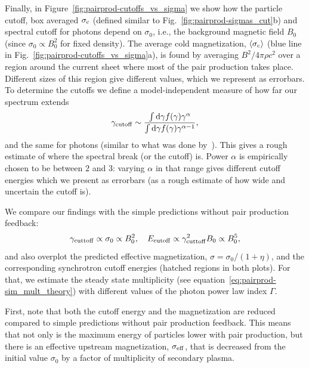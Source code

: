 Finally, in Figure~\ref{fig:pairprod-cutoffs_vs_sigma} we show how the particle cutoff, box averaged $\sigma_{\rm c}$ (defined similar to Fig.~\ref{fig:pairprod-sigmas_cut}b) and spectral cutoff for photons depend on $\sigma_0$, i.e., the background magnetic field $B_0$ (since $\sigma_0\propto B_0^2$ for fixed density). The average cold magnetization, $\langle \sigma_{\rm c}\rangle$ (blue line in Fig.~\ref{fig:pairprod-cutoffs_vs_sigma}a), is found by averaging $B^2/4\pi\rho c^2$ over a region around the current sheet where most of the pair production takes place. Different sizes of this region give different values, which we represent as errorbars. To determine the cutoffs we define a model-independent measure of how far our spectrum extends
\begin{equation}
    \gamma_{\rm cutoff}\sim \frac{\int\mathrm{d}\gamma f(\gamma)\gamma^\alpha}{\int\mathrm{d}\gamma f(\gamma)\gamma^{\alpha-1}},
\end{equation}
and the same for photons (similar to what was done by~\citealt{2015ApJ...809...55B}). This gives a rough estimate of where the spectral break (or the cutoff) is. Power $\alpha$ is empirically chosen to be between $2$ and $3$: varying $\alpha$ in that range gives different cutoff energies which we present as errorbars (as a rough estimate of how wide and uncertain the cutoff is).

We compare our findings with the simple predictions without pair production feedback:
\begin{equation}
    \gamma_{\rm cuttoff}\propto \sigma_0\propto B_0^2,~~~E_{\rm cutoff}\propto \gamma_{\rm cuttoff}^2 B_0\propto B_0^5,
\end{equation}
and also overplot the predicted effective magnetization, $\sigma=\sigma_0 / (1+\eta)$, and the corresponding synchrotron cutoff energies (hatched regions in both plots). For that, we estimate the steady state multiplicity (see equation~\ref{eq:pairprod-sim_mult_theory}) with different values of the photon power law index $\Gamma$.

First, note that both the cutoff energy and the magnetization are reduced compared to simple predictions without pair production feedback. This means that not only is the maximum energy of particles lower with pair production, but there is an effective upstream magnetization, $\sigma_{\rm eff}$, that is decreased from the initial value $\sigma_0$ by a factor of multiplicity of secondary plasma.

